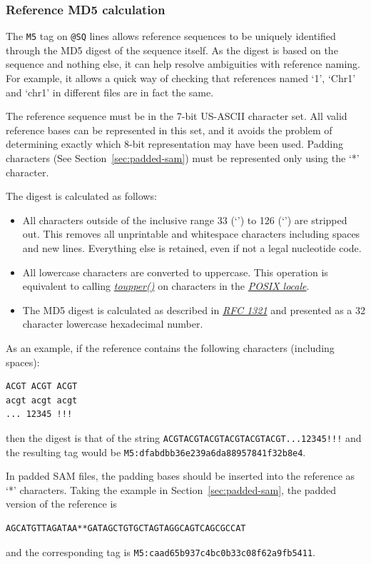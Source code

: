 \documentclass[10pt]{article}
\begin{document}
\subsubsection{Reference MD5 calculation}\label{sec:ref-md5}
The {\tt M5} tag on {\tt @SQ} lines allows reference sequences to be uniquely identified through the MD5 digest of the sequence itself.
As the digest is based on the sequence and nothing else, it can help resolve ambiguities with reference naming.
For example, it allows a quick way of checking that references named `1', `Chr1' and `chr1' in different files are in fact the same.

The reference sequence must be in the 7-bit US-ASCII character set.
All valid reference bases can be represented in this set, and it avoids the problem of determining exactly which 8-bit representation may have been used.
Padding characters (See Section~\ref{sec:padded-sam}) must be represented only using the `*' character. 

The digest is calculated as follows:
\begin{itemize}
\item All characters outside of the inclusive range 33 (`') to 126 (`') are stripped out.
This removes all unprintable and whitespace characters including spaces and new lines.
Everything else is retained, even if not a legal nucleotide code.
\item All lowercase characters are converted to uppercase.
This operation is equivalent to calling \href{http://pubs.opengroup.org/onlinepubs/9699919799/functions/toupper.html}{\sl toupper()} on characters in the \href{http://pubs.opengroup.org/onlinepubs/9699919799/basedefs/V1\_chap07.html\#tag\_07\_02}{\sl POSIX locale}.
\item The MD5 digest is calculated as described in \href{https://tools.ietf.org/html/rfc1321}{\sl RFC 1321} and presented as a 32 character lowercase hexadecimal number.
\end{itemize}

As an example, if the reference contains the following characters (including spaces):
\begin{verbatim}
ACGT ACGT ACGT
acgt acgt acgt
... 12345 !!!
\end{verbatim}
then the digest is that of the string {\tt ACGTACGTACGTACGTACGTACGT...12345!!!}
and the resulting tag would be {\tt M5:dfabdbb36e239a6da88957841f32b8e4}.

In padded SAM files, the padding bases should be inserted into the reference as `*' characters.
Taking the example in Section~\ref{sec:padded-sam}, the padded version of the reference is
\begin{verbatim}
AGCATGTTAGATAA**GATAGCTGTGCTAGTAGGCAGTCAGCGCCAT
\end{verbatim}
and the corresponding tag is {\tt M5:caad65b937c4bc0b33c08f62a9fb5411}.
\end{document}
